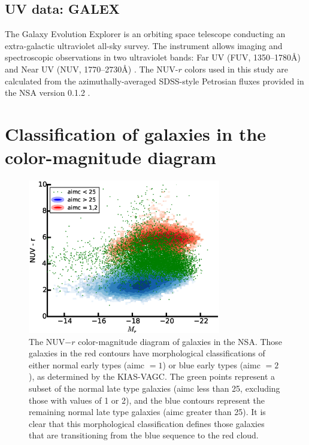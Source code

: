 \subsection{UV data: GALEX}\label{sec:GALEX}
The Galaxy Evolution Explorer \citep[GALEX;][]{Martin05} is an orbiting space 
telescope conducting an extra-galactic ultraviolet all-sky survey.  The 
instrument allows imaging and spectroscopic observations in two ultraviolet 
bands: Far UV (FUV, 1350--1780\AA) and Near UV (NUV, 1770--2730\AA) 
\citep{Morrissey07}.  The NUV-$r$ colors used in this study are calculated from 
the azimuthally-averaged SDSS-style Petrosian fluxes provided in the NSA version 
0.1.2 \citep{Blanton11}.




\section[Classifying the CMD]{Classification of galaxies in the color-magnitude diagram}

\begin{figure}
    \includegraphics[width=0.75\textwidth]{Images/GV/NUVr_CMD_3pop_scatter}
    \caption[NUV-$r$ color-magnitude diagram of NSA galaxies]{The NUV$-r$ 
    color-magnitude diagram of galaxies in the NSA.  Those galaxies in the red 
    contours have morphological classifications of either normal early types 
    (aimc $=1$) or blue early types (aimc $=2$), as determined by the KIAS-VAGC.  
    The green points represent a subset of the normal late type galaxies (aimc 
    less than 25, excluding those with values of 1 or 2), and the blue contours 
    represent the remaining normal late type galaxies (aimc greater than 25).  
    It is clear that this morphological classification defines those galaxies 
    that are transitioning from the blue sequence to the red cloud.}
    \label{fig:NUVr_CMD}
\end{figure}

